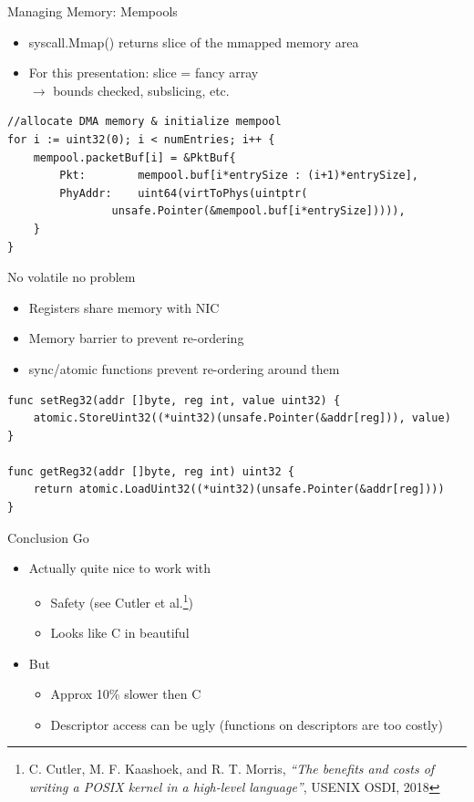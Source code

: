 \documentclass[NET,english,aspectratio=169,notitleframe]{tumbeamer}
\begin{document}
\begin{frame}[fragile]{Managing Memory: Mempools}
\begin{itemize}
\item syscall.Mmap() returns slice of the mmapped memory area
\item For this presentation: slice = fancy array\\
	$\rightarrow$ bounds checked, subslicing, etc.
\end{itemize}

\begin{verbatim}
//allocate DMA memory & initialize mempool
for i := uint32(0); i < numEntries; i++ {
	mempool.packetBuf[i] = &PktBuf{
		Pkt:        mempool.buf[i*entrySize : (i+1)*entrySize],
		PhyAddr:    uint64(virtToPhys(uintptr(
			    unsafe.Pointer(&mempool.buf[i*entrySize])))),
	}
}
\end{verbatim}
\end{frame}

\begin{frame}[fragile]{No volatile no problem}
\begin{itemize}
\item Registers share memory with NIC
\item Memory barrier to prevent re-ordering
\item sync/atomic functions prevent re-ordering around them
\end{itemize}
\begin{verbatim}
func setReg32(addr []byte, reg int, value uint32) {
	atomic.StoreUint32((*uint32)(unsafe.Pointer(&addr[reg])), value)
}

func getReg32(addr []byte, reg int) uint32 {
	return atomic.LoadUint32((*uint32)(unsafe.Pointer(&addr[reg])))
}
\end{verbatim}
\end{frame}

\begin{frame}{Conclusion Go}
\begin{itemize}
\item Actually quite nice to work with
\begin{itemize}
\item Safety (see Cutler et al.\footnote{C. Cutler, M. F. Kaashoek, and R. T. Morris, \emph{``The benefits and costs of writing a POSIX kernel in a high-level language''}, USENIX OSDI, 2018})
\item Looks like C in beautiful
\end{itemize}
\item<2-> But
\begin{itemize}
\item<2-> Approx 10\% slower then C %
\item<2-> Descriptor access can be ugly (functions on descriptors are too costly)
\end{itemize}
\end{itemize}
\end{frame}
\end{document}
